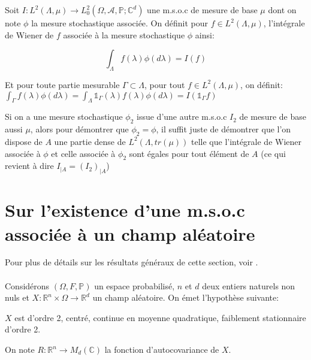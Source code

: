 \begin{definition}
\label{A22}
Soit $I: L^{2}(\Lambda, \mu)  \rightarrow L^{2}_{0}(\Omega, \mathcal{A}, \mathbb{P}; \mathbb{C}^{d})$ une m.s.o.c de mesure de base $\mu$ dont on note $\phi$ la mesure stochastique associée. On définit pour $f \in L^{2}(\Lambda, \mu)$, l'intégrale de Wiener de $f$ associée à la mesure stochastique $\phi$ ainsi: 

\begin{equation} \int_{\Lambda} f(\lambda) \phi(d\lambda) = I(f) \end{equation}

\noindent Et pour toute partie mesurable $\Gamma \subset \Lambda$, pour tout $f \in L^{2}(\Lambda, \mu)$, on définit:
$\int_{\Gamma} f(\lambda) \phi(d\lambda) = \int_{\Lambda} \mathds{1}_{\Gamma}(\lambda)f(\lambda) \phi(d\lambda) = I(\mathds{1}_{\Gamma}f)$\\
\end{definition}

\begin{remark} Si on a une mesure stochastique $\phi_2$ issue d'une autre m.s.o.c $I_2$ de mesure de base aussi $\mu$, alors pour démontrer que $\phi_2 = \phi$, il suffit juste de démontrer que l'on dispose de $A$ une partie dense de $L^{2}(\Lambda, tr(\mu))$ telle que l'intégrale de Wiener associée à $\phi$ et celle associée à $\phi_2$ sont égales pour tout élément de $A$ (ce qui revient à dire $I_{|A} = (I_{2})_{|A} $) \end{remark}



\section{Sur l'existence d'une m.s.o.c associée à un champ aléatoire}

\noindent Pour plus de détails sur les résultats généraux de cette section, voir \cite{alma991000210539806616}.\\
~\\Considérons $(\Omega, F, \mathbb{P})$ un espace probabilisé, $n$ et $d$ deux entiers naturels non nuls et $X: \mathbb{R}^n \times \Omega \rightarrow \mathbb{R}^d$ un champ aléatoire. On émet l'hypothèse suivante:
\begin{hypothesis}
$X$ est d'ordre 2, centré, continue en moyenne quadratique, faiblement stationnaire d'ordre 2. \label{hypFond}
\end{hypothesis}

\noindent On note $R: \mathbb{R}^n \rightarrow M_d(\mathbb{C})$ la fonction d'autocovariance de $X$.

